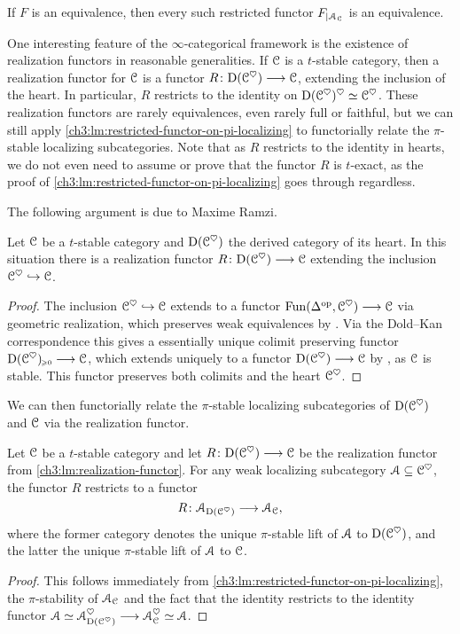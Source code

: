 \begin{corollary}
    If $F$ is an equivalence, then every such restricted functor $F_{\vert \EuScript{A}_{\EuScript{C}}}$ is an equivalence. 
\end{corollary}

One interesting feature of the $\infty$-categorical framework is the existence of realization functors in reasonable generalities. If $\EuScript{C}$ is a $t$-stable category, then a realization functor for $\EuScript{C}$ is a functor $R\colon\mathrm{D}(\EuScript{C}^{\heartsuit})\longrightarrow \EuScript{C}$, extending the inclusion of the heart. In particular, $R$ restricts to the identity on $\mathrm{D}(\EuScript{C}^\heartsuit)^\heartsuit\simeq \EuScript{C}^\heartsuit$. These realization functors are rarely equivalences, even rarely full or faithful, but we can still apply \cref{ch3:lm:restricted-functor-on-pi-localizing} to functorially relate the $\pi$-stable localizing subcategories. Note that as $R$ restricts to the identity in hearts, we do not even need to assume or prove that the functor $R$ is $t$-exact, as the proof of \cref{ch3:lm:restricted-functor-on-pi-localizing} goes through regardless.  

The following argument is due to Maxime Ramzi.

\begin{lemma}
    \label{ch3:lm:realization-functor}
    Let $\EuScript{C}$ be a $t$-stable category and $\mathrm{D}(\EuScript{C}^\heartsuit)$ the derived category of its heart. In this situation there is a realization functor $R\colon\mathrm{D}(\EuScript{C}^{\heartsuit})\longrightarrow \EuScript{C}$ extending the inclusion $\EuScript{C}^\heartsuit\hookrightarrow \EuScript{C}$. 
\end{lemma}
\begin{proof}
     The inclusion $\EuScript{C}^\heartsuit\hookrightarrow \EuScript{C}$ extends to a functor $\operatorname{Fun}(\Delta^{\mathrm{op}}, \EuScript{C}^\heartsuit)\longrightarrow \EuScript{C}$ via geometric realization, which preserves weak equivalences by \cite[1.2.4.4, 1.2.4.5]{Lurie_HA}. Via the Dold--Kan correspondence this gives a essentially unique colimit preserving functor $\mathrm{D}(\EuScript{C}^\heartsuit)_{\hspace{-1pt}\scriptscriptstyle\geqslant 0}\longrightarrow \EuScript{C}$, which extends uniquely to a functor $\mathrm{D}(\EuScript{C}^\heartsuit)\longrightarrow \EuScript{C}$ by \cite[1.4.4.5]{Lurie_HA}, as $\EuScript{C}$ is stable. This functor preserves both colimits and the heart $\EuScript{C}^\heartsuit$. 
\end{proof}

We can then functorially relate the $\pi$-stable localizing subcategories of $\mathrm{D}(\EuScript{C}^\heartsuit)$ and $\EuScript{C}$ via the realization functor. 

\begin{corollary}
    Let $\EuScript{C}$ be a $t$-stable category and let $R\colon \mathrm{D}(\EuScript{C}^\heartsuit)\longrightarrow \EuScript{C}$
    be the realization functor from \cref{ch3:lm:realization-functor}. For any weak localizing subcategory $\EuScript{A}\subseteq \EuScript{C}^\heartsuit$, the functor $R$ restricts to a functor
    \[R\colon \EuScript{A}_{\mathrm{D}(\EuScript{C}^\heartsuit)}\longrightarrow \EuScript{A}_{\EuScript{C}},\]
    where the former category denotes the unique $\pi$-stable lift of $\EuScript{A}$ to $\mathrm{D}(\EuScript{C}^\heartsuit)$, and the latter the unique $\pi$-stable lift of $\EuScript{A}$ to $\EuScript{C}$. 
\end{corollary}
\begin{proof}
    This follows immediately from \cref{ch3:lm:restricted-functor-on-pi-localizing}, the $\pi$-stability of $\EuScript{A}_{\EuScript{C}}$ and the fact that the identity restricts to the identity functor $\EuScript{A}\simeq\EuScript{A}_{\mathrm{D}(\EuScript{C}^\heartsuit)}^\heartsuit \longrightarrow \EuScript{A}_{\EuScript{C}}^\heartsuit\simeq \EuScript{A}$. 
\end{proof}

